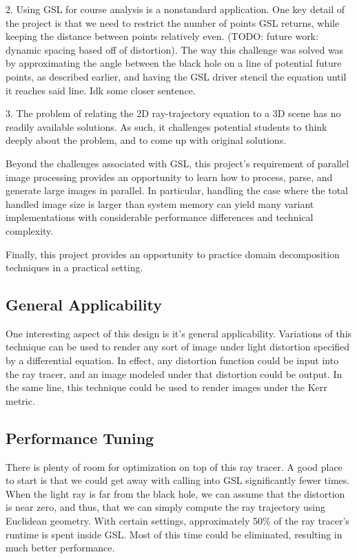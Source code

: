 2. Using GSL for course analysis is a nonstandard application. One key detail of the project is that we need to restrict the number of points GSL returns, while keeping the distance between points relatively even. (TODO: future work: dynamic spacing based off of distortion). The way this challenge was solved was by approximating the angle between the black hole on a line of potential future points, as described earlier, and having the GSL driver stencil the equation until it reaches said line. Idk some closer sentence.

3. The problem of relating the 2D ray-trajectory equation to a 3D scene has no readily available solutions. As such, it challenges potential students to think deeply about the problem, and to come up with original solutions.

Beyond the challenges associated with GSL, this project's requirement of parallel image processing provides an opportunity to learn how to process, parse, and generate large images in parallel. In particular, handling the case where the total handled image size is larger than system memory can yield many variant implementations with considerable performance differences and technical complexity. 

Finally, this project provides an opportunity to practice domain decomposition techniques in a practical setting. %

\subsection {General Applicability}

One interesting aspect of this design is it's general applicability. Variations of this technique can be used to render any sort of image under light distortion specified by a differential equation. In effect, any distortion function could be input into the ray tracer, and an image modeled under that distortion could be output. In the same line, this technique could be used to render images under the Kerr metric.
\subsection {Performance Tuning}

There is plenty of room for optimization on top of this ray tracer. A good place to start is that we could get away with calling into GSL significantly fewer times. When the light ray is far from the black hole, we can assume that the distortion is near zero, and thus, that we can simply compute the ray trajectory using Euclidean geometry. With certain settings, approximately 50\% of the ray tracer's runtime is spent inside GSL. Most of this time could be eliminated, resulting in much better performance. 

